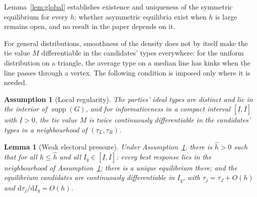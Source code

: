 \documentclass[12pt,letterpaper]{article}
\newtheorem{assumption}{Assumption}
\newtheorem{lemma}{Lemma}
\begin{document}
Lemma~\ref{lem:global} establishes existence and uniqueness of the symmetric equilibrium for every $h$; whether asymmetric equilibria exist when $h$ is large remains open, and no result in the paper depends on it.

For general distributions, smoothness of the density does not by itself make the tie value $M$ differentiable in the candidates' types everywhere: for the uniform distribution on a triangle, the average type on a median line has kinks when the line passes through a vertex. The following condition is imposed only where it is needed.

\begin{assumption}[Local regularity]\label{ass:local}
The parties' ideal types are distinct and lie in the interior of $\operatorname{supp}(G)$, and for informativeness in a compact interval $[\underline I,\overline I]$ with $\underline I>0$, the tie value $M$ is twice continuously differentiable in the candidates' types in a neighbourhood of $(\tau_L,\tau_R)$.
\end{assumption}

\begin{lemma}[Weak electoral pressure]\label{lem:smallh}
Under Assumption~\ref{ass:local}, there is $\hat h>0$ such that for all $h\le\hat h$ and all $I_q\in[\underline I,\overline I]$: every best response lies in the neighbourhood of Assumption~\ref{ass:local}; there is a unique equilibrium there; and the equilibrium candidates are continuously differentiable in $I_q$, with $\tau_j=\tau_J+O(h)$ and $\mathrm{d}\tau_j/\mathrm{d}I_q=O(h)$.
\end{lemma}
\end{document}
